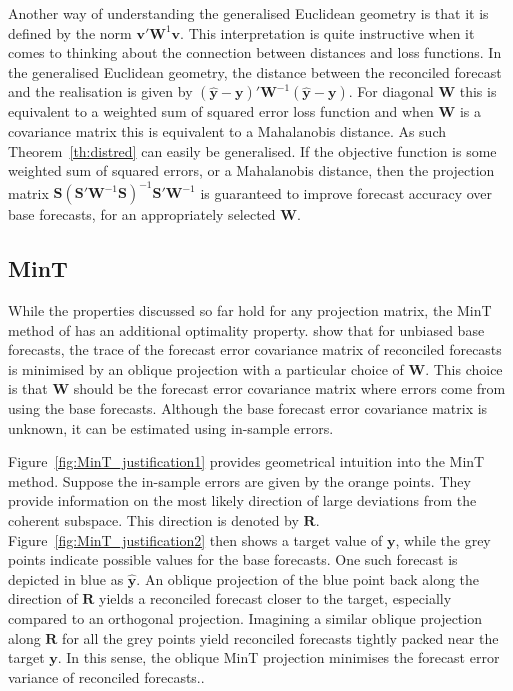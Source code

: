 \documentclass[12pt]{article}
\theoremstyle{definition}
\theoremstyle{property}
\begin{document}
	Another way of understanding the generalised Euclidean geometry is that it is defined by the norm $\bm{v}'\bm{W}^{1}\bm{v}$.  This interpretation is quite instructive when it comes to thinking about the connection between distances and loss functions.  In the generalised Euclidean geometry, the distance between the reconciled forecast and the realisation is given by $(\hat{\bm{y}}-\bm{y})'\bm{W}^{-1}(\hat{\bm{y}}-\bm{y})$.  For diagonal $\bm{W}$ this is equivalent to a weighted sum of squared error loss function and when $\bm{W}$ is a covariance matrix this is equivalent to a Mahalanobis distance.  As such Theorem~\ref{th:distred} can easily be generalised.  If the objective function is some weighted sum of squared errors, or a Mahalanobis distance, then the projection matrix $\bm{S}\left(\bm{S}'\bm{W}^{-1}\bm{S}\right)^{-1}\bm{S}'\bm{W}^{-1}$ is guaranteed to improve forecast accuracy over base forecasts, for an appropriately selected $\bm{W}$.
	
	\subsection{MinT}
	
	While the properties discussed so far hold for any projection matrix, the MinT method of \cite{Wickramasuriya2017} has an additional optimality property.  \cite{Wickramasuriya2017} show that for unbiased base forecasts, the trace of the forecast error covariance matrix of reconciled forecasts is minimised by an oblique projection with a particular choice of $\bm{W}$.  This choice is that $\bm{W}$ should be the forecast error covariance matrix where errors come from using the base forecasts.  Although the base forecast error covariance matrix is unknown, it can be estimated using in-sample errors.
	
	Figure~\ref{fig:MinT_justification1} provides geometrical intuition into the MinT method.  Suppose the in-sample errors are given by the orange points.  They provide information on the most likely direction of large deviations from the coherent subspace.  This direction is denoted by $\bm{R}$.  Figure~\ref{fig:MinT_justification2} then shows a target value of $\bm{y}$, while the grey points indicate possible values for the base forecasts.  One such forecast is depicted in blue as $\hat{\bm{y}}$.  An oblique projection of the blue point back along the direction of $\bm{R}$ yields a reconciled forecast closer to the target, especially compared to an orthogonal projection.  Imagining a similar oblique projection along $\bm{R}$ for all the grey points yield reconciled forecasts tightly packed near the target $\bm{y}$.  In this sense, the oblique MinT projection minimises the forecast error variance of reconciled forecasts..
	
\end{document}
